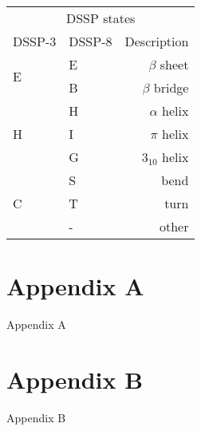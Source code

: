 \documentclass{article}
\begin{document}
\begin{tabular}{l|lr}
\hline
\multicolumn{3}{c}{DSSP states} \\
\cline{1-3}
DSSP-3    & DSSP-8 & Description  \\
\hline
\multirow{2}{*}{E}& E       & $\beta$ sheet\\
&B      & $\beta$ bridge\\ 
\hline
\multirow{3}{*}{H}&H      & $\alpha$ helix\\
&I      & $\pi$ helix\\
&G       & $3_{10}$ helix\\ 
\hline
\multirow{3}{*}{C}&S       & bend\\
&T      & turn\\
&-       & other\\

\hline
\end{tabular}




\begin{appendices}
\section{Appendix A}
Appendix A
\section{Appendix B}
Appendix B
\end{appendices}
\end{document}
